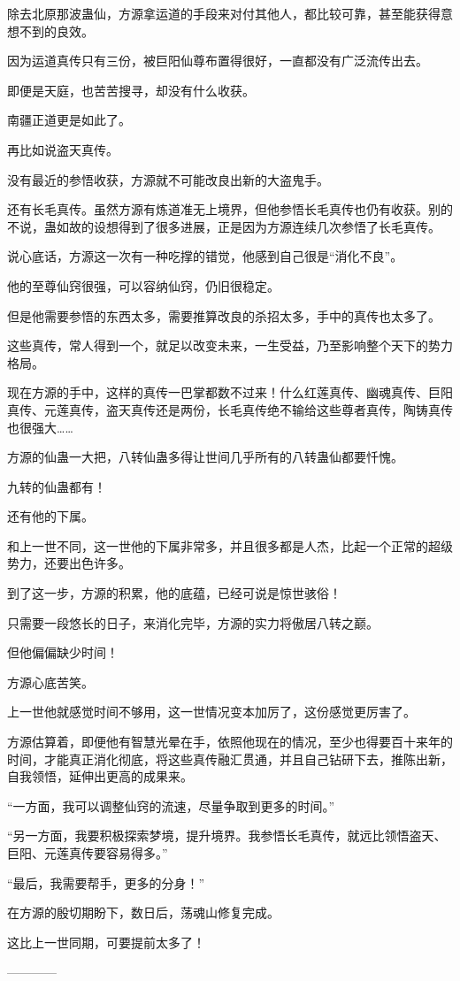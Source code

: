 \begin{this_body}
除去北原那波蛊仙，方源拿运道的手段来对付其他人，都比较可靠，甚至能获得意想不到的良效。

因为运道真传只有三份，被巨阳仙尊布置得很好，一直都没有广泛流传出去。

即便是天庭，也苦苦搜寻，却没有什么收获。

南疆正道更是如此了。

再比如说盗天真传。

没有最近的参悟收获，方源就不可能改良出新的大盗鬼手。

还有长毛真传。虽然方源有炼道准无上境界，但他参悟长毛真传也仍有收获。别的不说，蛊如故的设想得到了很多进展，正是因为方源连续几次参悟了长毛真传。

说心底话，方源这一次有一种吃撑的错觉，他感到自己很是“消化不良”。

他的至尊仙窍很强，可以容纳仙窍，仍旧很稳定。

但是他需要参悟的东西太多，需要推算改良的杀招太多，手中的真传也太多了。

这些真传，常人得到一个，就足以改变未来，一生受益，乃至影响整个天下的势力格局。

现在方源的手中，这样的真传一巴掌都数不过来！什么红莲真传、幽魂真传、巨阳真传、元莲真传，盗天真传还是两份，长毛真传绝不输给这些尊者真传，陶铸真传也很强大……

方源的仙蛊一大把，八转仙蛊多得让世间几乎所有的八转蛊仙都要忏愧。

九转的仙蛊都有！

还有他的下属。

和上一世不同，这一世他的下属非常多，并且很多都是人杰，比起一个正常的超级势力，还要出色许多。

到了这一步，方源的积累，他的底蕴，已经可说是惊世骇俗！

只需要一段悠长的日子，来消化完毕，方源的实力将傲居八转之巅。

但他偏偏缺少时间！

方源心底苦笑。

上一世他就感觉时间不够用，这一世情况变本加厉了，这份感觉更厉害了。

方源估算着，即便他有智慧光晕在手，依照他现在的情况，至少也得要百十来年的时间，才能真正消化彻底，将这些真传融汇贯通，并且自己钻研下去，推陈出新，自我领悟，延伸出更高的成果来。

“一方面，我可以调整仙窍的流速，尽量争取到更多的时间。”

“另一方面，我要积极探索梦境，提升境界。我参悟长毛真传，就远比领悟盗天、巨阳、元莲真传要容易得多。”

“最后，我需要帮手，更多的分身！”

在方源的殷切期盼下，数日后，荡魂山修复完成。

这比上一世同期，可要提前太多了！

------------

\end{this_body}

